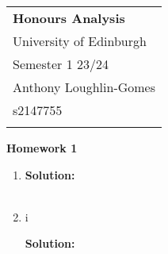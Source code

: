 \documentclass[a4paper,12pt]{article} %
\begin{document}
\thispagestyle{empty} 
\begin{tabular}{p{15.5cm}} 

{\large \bf Honours Analysis} \\ %

University of Edinburgh \\ Semester 1 23/24  \\ Anthony Loughlin-Gomes \\ s2147755\\
\hline %
\\
\end{tabular} 
\vspace*{0.3cm} 
\begin{center}  

	{\Large \bf Homework 1} %

	\vspace{2mm}
\end{center}  
\vspace{0.4cm}

\begin{enumerate}

\item %
\textbf{Solution:}\\\\



\newpage 

\item i%

\textbf{Solution:}\\\\


\end{enumerate}

\clearpage
\end{document}
